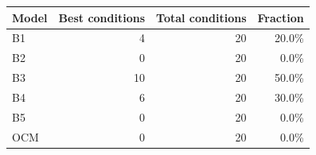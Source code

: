 \begin{tabular}{lrrr}
\toprule
Model & Best conditions & Total conditions & Fraction \\
\midrule
B1 & 4 & 20 & 20.0\% \\
B2 & 0 & 20 & 0.0\% \\
B3 & 10 & 20 & 50.0\% \\
B4 & 6 & 20 & 30.0\% \\
B5 & 0 & 20 & 0.0\% \\
OCM & 0 & 20 & 0.0\% \\
\bottomrule
\end{tabular}
